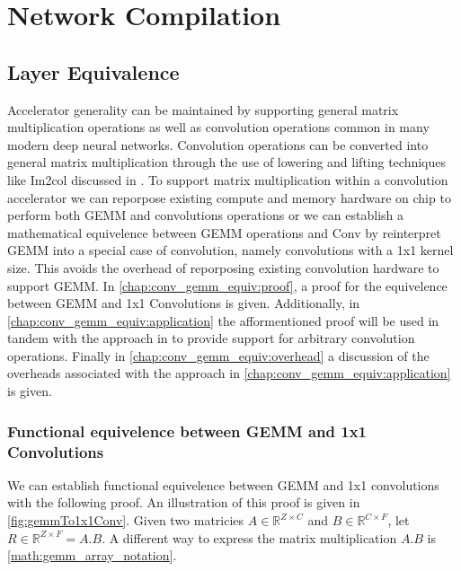 \chapter{Network Compilation}
\label{chap:net_compile}

\section{Layer Equivalence}

Accelerator generality can be maintained by supporting general matrix
multiplication operations as well as convolution operations common in many
modern deep neural networks. Convolution operations can be converted into
general matrix multiplication through the use of lowering and lifting techniques
like Im2col discussed in \cite{cafe_con_troll}. To support matrix multiplication
within a convolution accelerator we can reporpose existing compute and memory
hardware on chip to perform both GEMM and convolutions operations or we can
establish a mathematical equivelence between GEMM operations and Conv by
reinterpret GEMM into a special case of convolution, namely convolutions with a
1x1 kernel size. This avoids the overhead of reporposing existing convolution
hardware to support GEMM. In \autoref{chap:conv_gemm_equiv:proof}, a proof for
the equivelence between GEMM and 1x1 Convolutions is given. Additionally, in
\autoref{chap:conv_gemm_equiv:application} the afformentioned proof will be used
in tandem with the approach in \cite{cafe_con_troll} to provide support for
arbitrary convolution operations. Finally in
\autoref{chap:conv_gemm_equiv:overhead} a discussion of the overheads associated
with the approach in \autoref{chap:conv_gemm_equiv:application} is given.

\clearpage

\subsection{Functional equivelence between GEMM and 1x1 Convolutions}
\label{chap:conv_gemm_equiv:proof}

We can establish functional equivelence between GEMM and 1x1 convolutions with
the following proof. An illustration of this proof is given in
\autoref{fig:gemmTo1x1Conv}.  
Given two matricies $A\in \mathbb{R}^{Z \times C}$ and $B \in \mathbb{R}^{C
\times F}$, let $R \in \mathbb{R}^{Z\times F} = A.B$. A different way to express
the matrix multiplication $A.B$ is \autoref{math:gemm_array_notation}.  

